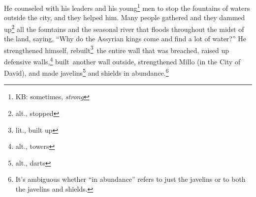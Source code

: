 
\begin{inparaenum}
     He counseled with his leaders and his young\footnote{KB: sometimes, \textit{strong}} men to stop the fountains of waters outside the city, and they helped him.%
     Many people gathered and they dammed up\footnote{alt., stopped} all the fountains and the seasonal river that floods throughout the midst of the land, saying, ``Why do the Assyrian kings come and find a lot of water?''%
     He strengthened himself, rebuilt\footnote{lit., built up}\thinspace\understood\ the entire wall that was breached, raised up defensive walls,\footnote{alt., towers} built\understood\ another wall outside, strengthened Millo (in the City of David), and made javelins\footnote{alt., darts} and shields in abundance.\footnote{It's ambiguous whether ``in abundance'' refers to just the javelins or to both the javelins and shields.}%
    
    
    
    
\end{inparaenum}
